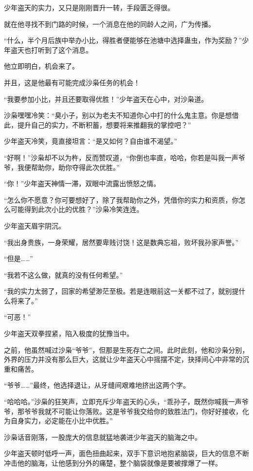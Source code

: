 \begin{this_body}
少年盗天的实力，又只是刚刚晋升一转，手段匮乏得很。

就在他寻找不到门路的时候，一个消息在他的同龄人之间，广为传播。

“什么，半个月后族中举办小比，得胜者便能够在池塘中选择蛊虫，作为奖励？”少年盗天也打听到了这个消息。

他立即明白，机会来了。

并且，这是他最有可能完成沙枭任务的机会！

“我要参加小比，并且还要取得优胜！”少年盗天在心中，对沙枭道。

沙枭嘿嘿冷笑：“臭小子，别以为老夫不知道你心中打的什么鬼主意。你是想借此，提升自己的实力，不断积蓄，想要将来推翻我的掌控吧？”

少年盗天冷笑，竟直接坦言：“是又如何？自由谁不渴望。”

“好啊！”沙枭却不以为杵，反而赞叹道，“你倒也率直，哈哈，你若是叫我一声爷爷，我便帮助你，助你夺得此次优胜。”

“你！”少年盗天神情一滞，双眼中流露出愤怒之情。

“怎么你不愿意？你可要想好了，除了我帮助你之外，凭借你的实力和资质，你怎么可能得到此次小比的优胜？”沙枭冷笑连连。

少年盗天眉宇阴沉。

“我出身贵族，一身荣耀，居然要卑贱讨饶！这是数典忘祖，败坏我孙家声誉。”

“但是……”

“我若不这么做，就真的没有任何希望。”

“我的实力太弱了，回家的希望渺茫至极。若是连眼前这一关都不过了，就别提什么将来了。”

“可恶！”

少年盗天双拳捏紧，陷入极度的犹豫当中。

之前，他虽然喊过沙枭“爷爷”，但那是生死存亡之间。此时此刻，他和沙枭分别，外界的压力并没有那么巨大，这就让少年盗天心中摇摆不定，抉择间心中非常的沉重和痛苦。

“爷爷……”最终，他选择退让，从牙缝间艰难地挤出这两个字。

“哈哈哈。”沙枭的狂笑声，立即充斥少年盗天的心头，“乖孙子，既然你喊我一声爷爷，那爷爷我就不可能让你落败。这是爷爷我交给你的致胜法门，你好好接收，化为自身实力，必定能在小比中优胜。”

沙枭话音刚落，一股庞大的信息就猛地袭进少年盗天的脑海之中。

少年盗天顿时低呼一声，面色扭曲起来，双手下意识地抱紧脑袋，巨大的信息不断冲击他的脑海，让他感到分外的痛楚，整个脑袋就像是要被撑爆了一样。


\end{this_body}
